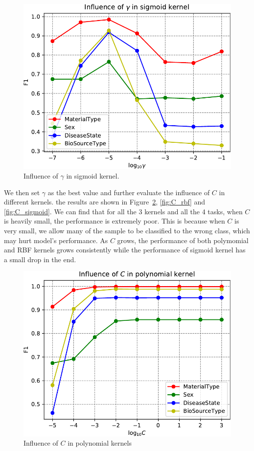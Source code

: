 \documentclass[sigconf]{acmart}
\begin{document}
\begin{figure}[h]
\centering
\includegraphics[width=0.8\linewidth]{../figs/gamma_sigmoid}
\caption{Influence of $\gamma$ in sigmoid kernel.}
\label{fig:gamma_sigmoid}
\end{figure}


We then set $\gamma$ as the best value and further evaluate the influence of $C$ in different kernels. the results are shown in Figure~\ref{fig:C_poly}, \ref{fig:C_rbf} and \ref{fig:C_sigmoid}. We can find that for all the 3 kernels and all the 4 tasks, when $C$ is heavily small, the performance is extremely poor. This is because when $C$ is very small, we allow many of the sample to be classified to the wrong class, which may hurt model's performance. As $C$ grows, the performance of both polymomial and RBF kernels grows consistently while the performance of sigmoid kernel has a small drop in the end. 


\begin{figure}[h]
\centering
\includegraphics[width=0.8\linewidth]{../figs/C_poly}
\caption{Influence of $C$ in polynomial kernels}
\label{fig:C_poly}
\end{figure}
\end{document}
